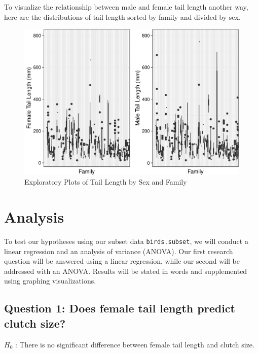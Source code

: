 \documentclass[
  12pt,
]{article}
\begin{document}
\newpage

To visualize the relationship between male and female tail length
another way, here are the distributions of tail length sorted by family
and divided by sex.

\begin{figure}
\centering
\includegraphics{Project_Code_files/figure-latex/r exploratory_plots_1-1.pdf}
\caption{Exploratory Plots of Tail Length by Sex and Family}
\end{figure}

\newpage

\hypertarget{analysis}{%
\section{Analysis}\label{analysis}}

To test our hypotheses using our subset data \texttt{birds.subset}, we
will conduct a linear regression and an analysis of variance (ANOVA).
Our first research question will be answered using a linear regression,
while our second will be addressed with an ANOVA. Results will be stated
in words and supplemented using graphing visualizations.

\hypertarget{question-1-does-female-tail-length-predict-clutch-size}{%
\subsection{Question 1: Does female tail length predict clutch
size?}\label{question-1-does-female-tail-length-predict-clutch-size}}

\(H_0\) : There is no significant difference between female tail length
and clutch size.
\end{document}
